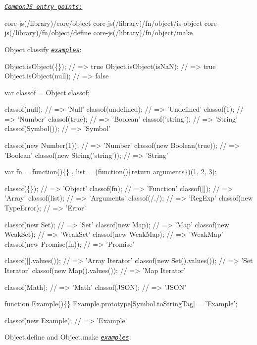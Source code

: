 \href{#commonjs}{\tt {\itshape Common\+JS entry points\+:}} 
\begin{DoxyCode}
core-js(/library)/core/object
core-js(/library)/fn/object/is-object
core-js(/library)/fn/object/define
core-js(/library)/fn/object/make
\end{DoxyCode}
 Object classify \href{http://goo.gl/YZQmGo}{\tt {\itshape examples}}\+: 
\begin{DoxyCode}
Object.isObject(\{\});    // => true
Object.isObject(isNaN); // => true
Object.isObject(null);  // => false

var classof = Object.classof;

classof(null);                 // => 'Null'
classof(undefined);            // => 'Undefined'
classof(1);                    // => 'Number'
classof(true);                 // => 'Boolean'
classof('string');             // => 'String'
classof(Symbol());             // => 'Symbol'

classof(new Number(1));        // => 'Number'
classof(new Boolean(true));    // => 'Boolean'
classof(new String('string')); // => 'String'

var fn   = function()\{\}
  , list = (function()\{return arguments\})(1, 2, 3);

classof(\{\});                   // => 'Object'
classof(fn);                   // => 'Function'
classof([]);                   // => 'Array'
classof(list);                 // => 'Arguments'
classof(/./);                  // => 'RegExp'
classof(new TypeError);        // => 'Error'

classof(new Set);              // => 'Set'
classof(new Map);              // => 'Map'
classof(new WeakSet);          // => 'WeakSet'
classof(new WeakMap);          // => 'WeakMap'
classof(new Promise(fn));      // => 'Promise'

classof([].values());          // => 'Array Iterator'
classof(new Set().values());   // => 'Set Iterator'
classof(new Map().values());   // => 'Map Iterator'

classof(Math);                 // => 'Math'
classof(JSON);                 // => 'JSON'

function Example()\{\}
Example.prototype[Symbol.toStringTag] = 'Example';

classof(new Example);          // => 'Example'
\end{DoxyCode}
 {\ttfamily Object.\+define} and {\ttfamily Object.\+make} \href{http://goo.gl/rtpD5Z}{\tt {\itshape examples}}\+: 
